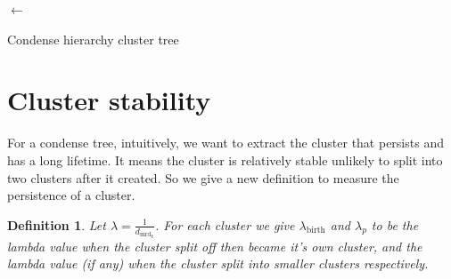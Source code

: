 \documentclass{article}
\newtheorem{definition}{Definition}
\begin{document}
\begin{algorithm}[H]
	\SetAlgoNoLine
	\nodeList $\leftarrow$ \;
	\caption{Condense hierarchy cluster tree}
\end{algorithm}


\section{Cluster stability}

For a condense tree, intuitively, we want to extract the cluster that persists and has a long lifetime. It means the cluster is relatively stable unlikely to split into two clusters after it created. So we give a new definition to measure the persistence of a cluster.

\begin{tcolorbox}
	\begin{definition}
		Let $\lambda = \frac{1}{d_{\mathrm{mrd}_k}}$. For each cluster we give $\lambda_{\mathrm{birth}}$ and $\lambda_p$ to be the lambda value when the cluster split off then became it’s own cluster, and the lambda value (if any) when the cluster split into smaller clusters respectively.
	\end{definition}
\end{tcolorbox}
 
\end{document}

